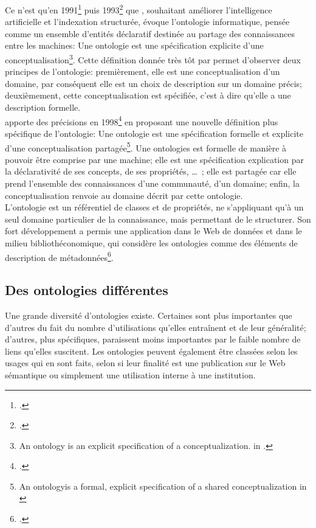 Ce n'est qu'en 1991\footcite{gruber_role_1991} puis 1993\footcite{gruber_toward_1993} que , souhaitant améliorer l'intelligence artificielle et l'indexation structurée, évoque l'ontologie informatique, pensée comme un ensemble d'entités déclaratif destinée au partage des connaissances entre les machines: \og Une ontologie est une spécification explicite d’une conceptualisation\fg{}\footnote{\og An ontology is an explicit specification of a conceptualization. \fg{} in \cite[p.1]{gruber_toward_1993}.}. Cette définition donnée très tôt par  permet d'observer deux principes de l'ontologie: premièrement, elle est une conceptualisation d'un domaine, par conséquent elle est un choix de description sur un domaine précis; deuxièmement, cette conceptualisation est spécifiée, c'est à dire qu'elle a une description formelle.\\

 apporte des précisions en 1998\footcite{studer_knowledge_1998} en proposant une nouvelle définition plus spécifique de l'ontologie: \og Une ontologie est
une spécification formelle et explicite d’une conceptualisation partagée\fg{}\footnote{\og An ontologyis a formal, explicit specification of a shared conceptualization\fg{} in \cite{studer_knowledge_1998}}. Une ontologies est formelle de manière à pouvoir être comprise par une machine; elle est une spécification explication par la déclarativité de ses concepts, de ses propriétés, \dots~; elle est partagée car elle prend l'ensemble des connaissances d'une communauté, d'un domaine; enfin, la conceptualisation renvoie au domaine décrit par cette ontologie.\\

L'ontologie est un référentiel de classes et de propriétés, ne s'appliquant qu'à un seul domaine particulier de la connaissance, mais permettant de le structurer. Son fort développement a permis une application dans le Web de données et dans le milieu bibliothéconomique, qui considère les ontologies comme \og des éléments de description de métadonnées\fg{}\footcite{baker_rapport_2012}.

\subsection{\label{II-B-1-b}Des ontologies différentes}

Une grande diversité d'ontologies existe. Certaines sont plus importantes que d'autres du fait du nombre d'utilisations qu'elles entraînent et de leur généralité; d'autres, plus spécifiques, paraissent moins importantes par le faible nombre de liens qu'elles suscitent. Les ontologies peuvent également être classées selon les usages qui en sont faits, selon si leur finalité est une publication sur le Web sémantique ou simplement une utilisation interne à une institution.\\

